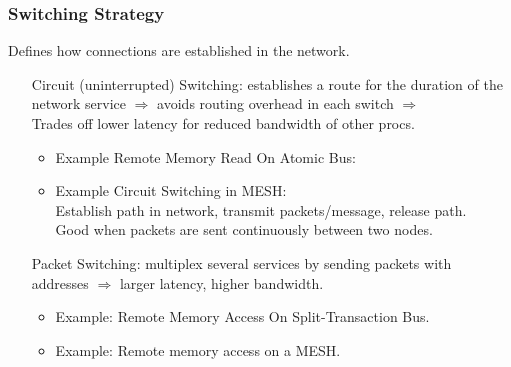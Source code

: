 \documentclass{beamer}
\renewcommand{\emph}[1]{\textcolor{structure}{#1}}
\newcommand{\emp}[1]{\textcolor{DikuRed}{ #1}}
\begin{document}
\begin{frame}[fragile,t]
\frametitle{Switching Strategy}

\alert{Defines how connections are established in the network.}

\begin{itemize}
    \item[Circuit] (uninterrupted) \emph{Switching}: establishes a route for 
                    the duration of the network service $\Rightarrow$ avoids routing
                    overhead in each switch $\Rightarrow$\\ 
                    Trades off \emph{lower latency} for 
                    \emp{reduced bandwidth of other procs}.\medskip
        \begin{itemize}
            \item Example Remote Memory Read On Atomic Bus:\\
            \item Example Circuit Switching in MESH:\\
                        Establish path in network, transmit packets/message, release path.\\
                        \emph{Good when packets are sent continuously between two nodes.} 
        \end  {itemize}\bigskip

    \item[Packet] \emph{Switching}: multiplex several services by sending packets with addresses
                $\Rightarrow$ \emp{larger latency}, \emph{higher bandwidth}.\medskip
        \begin{itemize}
            \item Example: Remote Memory Access On Split-Transaction Bus.
            \item Example: Remote memory access on a MESH. 
        \end  {itemize}
\end  {itemize}

\end{frame}
\end{document}

